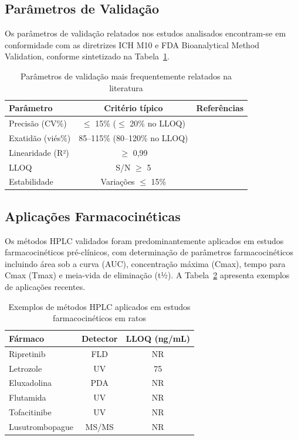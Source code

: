 \subsection{Parâmetros de Validação}

Os parâmetros de validação relatados nos estudos analisados encontram-se em conformidade com as diretrizes ICH M10 e FDA Bioanalytical Method Validation, conforme sintetizado na Tabela~\ref{tab:validacao}.

\begin{table}[ht]
\caption{Parâmetros de validação mais frequentemente relatados na literatura}
\label{tab:validacao}
\begin{tabular}{lcc}
\hline
Parâmetro & Critério típico & Referências \\
\hline
Precisão (CV\%) & $\leq$ 15\% ($\leq$ 20\% no LLOQ) & \cite{kosta2024, singh2023} \\
Exatidão (viés\%) & 85--115\% (80--120\% no LLOQ) & \\
Linearidade (R²) & $\geq$ 0,99 & \cite{singh2023} \\
LLOQ & S/N $\geq$ 5 & \cite{ich2005} \\
Estabilidade & Variações $\leq$ 15\% & \cite{fda2018} \\
\hline
\end{tabular}
\end{table}

\subsection{Aplicações Farmacocinéticas}

Os métodos HPLC validados foram predominantemente aplicados em estudos farmacocinéticos pré-clínicos, com determinação de parâmetros farmacocinéticos incluindo área sob a curva (AUC), concentração máxima (Cmax), tempo para Cmax (Tmax) e meia-vida de eliminação (t½). A Tabela~\ref{tab:aplicacoes} apresenta exemplos de aplicações recentes.

\begin{table}[ht]
\caption{Exemplos de métodos HPLC aplicados em estudos farmacocinéticos em ratos}
\label{tab:aplicacoes}
\begin{tabular}{lcc}
\hline
Fármaco & Detector & LLOQ (ng/mL) \\
\hline
Ripretinib & FLD & NR \\
Letrozole & UV & 75 \\
Eluxadolina & PDA & NR \\
Flutamida & UV & NR \\
Tofacitinibe & UV & NR \\
Lusutrombopague & MS/MS & NR \\
\hline
\end{tabular}
\end{table}

